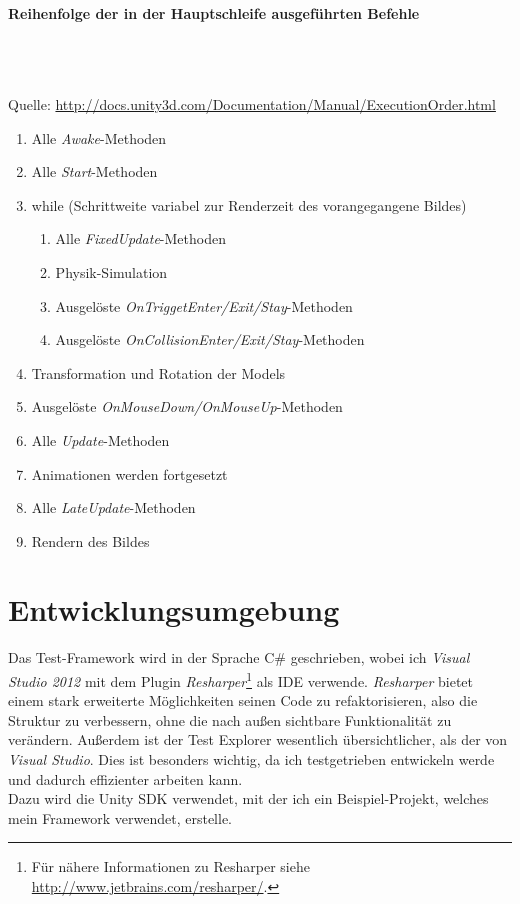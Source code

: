 \paragraph{Reihenfolge der in der Hauptschleife ausgeführten Befehle}\hypertarget{MainLoopOrder}{~}\\
{\small Quelle: \url{http://docs.unity3d.com/Documentation/Manual/ExecutionOrder.html}}
\begin{enumerate}
\item Alle \textit{Awake}-Methoden
\item Alle \textit{Start}-Methoden
\item while (Schrittweite variabel zur Renderzeit des vorangegangene Bildes)
	\begin{enumerate}[label*=\arabic*.]
	\item Alle \textit{FixedUpdate}-Methoden
	\item Physik-Simulation
	\item Ausgelöste \textit{OnTriggetEnter/Exit/Stay}-Methoden
	\item Ausgelöste \textit{OnCollisionEnter/Exit/Stay}-Methoden
	\end{enumerate}
\item Transformation und Rotation der Models
\item Ausgelöste \textit{OnMouseDown/OnMouseUp}-Methoden
\item Alle \textit{Update}-Methoden
\item Animationen werden fortgesetzt
\item Alle \textit{LateUpdate}-Methoden
\item Rendern des Bildes
\end{enumerate}
\clearpage

\section{Entwicklungsumgebung}

Das Test-Framework wird in der Sprache C\# geschrieben, wobei ich \textit{Visual Studio 2012} mit dem Plugin \textit{Resharper}\footnote{Für nähere Informationen zu Resharper siehe \url{http://www.jetbrains.com/resharper/}.} als IDE verwende. \textit{Resharper} bietet einem stark erweiterte Möglichkeiten seinen Code zu refaktorisieren, also die Struktur zu verbessern, ohne die nach außen sichtbare Funktionalität zu verändern. Außerdem ist der Test Explorer wesentlich übersichtlicher, als der von \textit{Visual Studio}. Dies ist besonders wichtig, da ich testgetrieben entwickeln werde und dadurch effizienter arbeiten kann.\\
Dazu wird die Unity SDK verwendet, mit der ich ein Beispiel-Projekt, welches mein Framework verwendet, erstelle.

